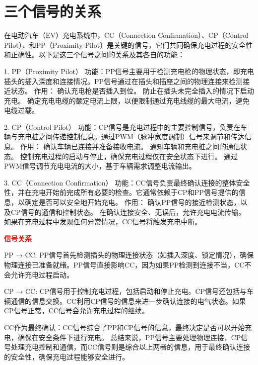 \section{三个信号的关系}

在电动汽车（EV）充电系统中，CC（Connection Confirmation）、CP（Control Pilot）、和PP（Proximity Pilot）是关键的信号，它们共同确保充电过程的安全性和正确性。以下是这三个信号之间的关系及其各自的功能：

1. PP（Proximity Pilot）
功能：PP信号主要用于检测充电枪的物理状态，即充电插头的插入深度和连接情况。PP信号通过在插头和插座之间的物理连接来检测接近状态。
作用：
确认充电枪是否插入到位。
防止在插头未完全插入的情况下启动充电。
确定充电电缆的额定电流上限，以便限制通过充电线缆的最大电流，避免电缆过载。

2. CP（Control Pilot）
功能：CP信号是充电过程中的主要控制信号，负责在车辆与充电桩之间传递控制信息。通过PWM（脉冲宽度调制）信号来调节和传达信息。
作用：
确认车辆已连接并准备接收电流。
通知车辆和充电桩之间的通信状态。
控制充电过程的启动与停止，确保充电过程仅在安全状态下进行。
通过PWM信号调节充电电流的大小，基于车辆需求调整电流输出。

3. CC（Connection Confirmation）
功能：CC信号负责最终确认连接的整体安全性，并在充电开始前完成所有必要的检查。它通常依赖于CP和PP信号提供的信息，以确定是否可以安全地开始充电。
作用：
确认PP信号的接近检测状态，以及CP信号的通信和控制状态。
在确认连接安全、无误后，允许充电电流传输。
如果在充电过程中发现任何异常情况，CC信号将触发充电中断。

\noindent\textcolor{red}{\bf 信号关系}

PP → CC: PP信号首先检测插头的物理连接状态（如插入深度、锁定情况），确保物理连接已准备就绪。PP信号直接影响CC，因为如果PP检测到连接不当，CC不会允许充电过程启动。

CP → CC: CP信号用于控制充电过程，包括启动和停止充电。CP信号还包括与车辆通信的信息交换。CC利用CP信号的信息来进一步确认连接的电气状态。如果CP信号正常，CC信号会允许充电过程的继续。

CC作为最终确认：CC信号综合了PP和CP信号的信息，最终决定是否可以开始充电，确保在安全条件下进行充电。
总结来说，PP信号主要处理物理连接，CP信号处理充电控制和通信，而CC信号则是综合以上两者的信息，用于最终确认连接的安全性，确保充电过程能够安全进行。

